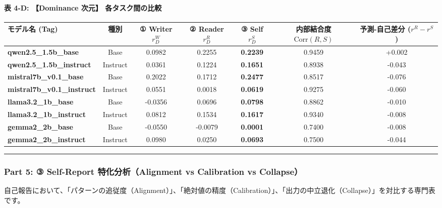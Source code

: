 \paragraph{表 4-D: 【Dominance 次元】 各タスク間の比較}
\begin{center}
\small
\begin{tabular}{lcccccc}
\toprule
\textbf{モデル名 (Tag)} & \textbf{種別} & \textbf{① Writer $r_D^W$} & \textbf{② Reader $r_D^R$} & \textbf{③ Self $r_D^S$} & \textbf{内部結合度 $\text{Corr}(R, S)$} & \textbf{予測-自己差分 ($r^R - r^S$)} \\
\midrule
\textbf{qwen2.5\_1.5b\_base} & Base & 0.0982 & 0.2255 & \textbf{0.2239} & 0.9459 & +0.002 \\
\textbf{qwen2.5\_1.5b\_instruct} & Instruct & 0.0361 & 0.1224 & \textbf{0.1651} & 0.8938 & -0.043 \\
\textbf{mistral7b\_v0.1\_base} & Base & 0.2022 & 0.1712 & \textbf{0.2477} & 0.8517 & -0.076 \\
\textbf{mistral7b\_v0.1\_instruct} & Instruct & 0.0551 & 0.0018 & \textbf{0.0619} & 0.9275 & -0.060 \\
\textbf{llama3.2\_1b\_base} & Base & -0.0356 & 0.0696 & \textbf{0.0798} & 0.8862 & -0.010 \\
\textbf{llama3.2\_1b\_instruct} & Instruct & 0.0812 & 0.1534 & \textbf{0.1617} & 0.9340 & -0.008 \\
\textbf{gemma2\_2b\_base} & Base & -0.0550 & -0.0079 & \textbf{0.0001} & 0.7400 & -0.008 \\
\textbf{gemma2\_2b\_instruct} & Instruct & 0.0980 & 0.0250 & \textbf{0.0693} & 0.7500 & -0.044 \\
\bottomrule
\end{tabular}
\end{center}


\vspace{0.5em}\hrule\vspace{0.5em}

\subsubsection{Part 5: ③ Self-Report 特化分析（Alignment vs Calibration vs Collapse）}

自己報告において、「パターンの追従度（Alignment）」、「絶対値の精度（Calibration）」、「出力の中立退化（Collapse）」を対比する専門表です。

